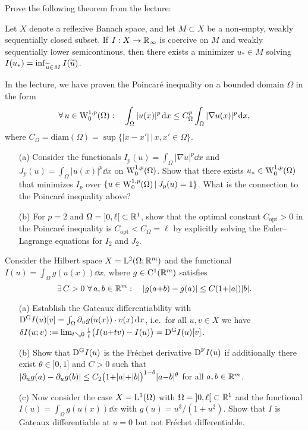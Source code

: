 \documentclass[12pt,a4paper]{article}
\begin{document}

\setcounter{AUFGABE}{32}



 Prove the following theorem from the lecture:

Let $X$ denote a reflexive Banach space, and let $M\subset X$ be a non-empty, weakly sequentially closed subset.
If $I:X\to {\mathbb R}_\infty$ is coercive on $M$ and weakly sequentially lower semicontinous, then there exists a minimizer $u_*\in M$ solving $I(u_*) = \inf_{\widetilde u \in M}I(\widetilde  u)$. 


In the lecture, we have proven the Poincar\'e inequality on a bounded domain 
$\Omega$ in the form
\[
\forall\, u\in{\mathrm W}^{1,p}_0(\Omega):\quad \int_\Omega |u(x)|^p \;\!\mathrm{d} x \leq C_\Omega^p \int_\Omega |\nabla u(x)|^p\;\!\mathrm{d} x,
\]
where $C_\Omega=\mathrm{diam}(\Omega) = \sup\{|x{-}x'|\,|\,x,x'\in\Omega\}$.

\begin{itemize}
\item[(a)] Consider the functionals $I_p(u) = \int_\Omega |\nabla u|^p\dd x$ and $J_p(u) = \int_\Omega |u(x)|^p\dd x$ on ${\mathrm W}^{1,p}_0(\Omega)$. Show that there exists $u_*\in {\mathrm W}^{1,p}_0(\Omega)$ that minimizes $I_p$ over $\{u\in {\mathrm W}^{1,p}_0(\Omega)\,|\, J_p(u) = 1\}$. What is the connection to the Poincar\'e inequality above?

\item[(b)] For $p=2$ and $\Omega=\left]0,\ell\right[\subset {\mathbb R}^1$, show that the optimal constant $C_\text{opt}>0$ in the Poincar\'e inequality is $C_\text{opt} < C_\Omega =\ell$ by explicitly solving the Euler--Lagrange equations for $I_2$ and $J_2$.
\end{itemize}

  Consider the Hilbert space $X={\mathrm L}^2(\Omega;{\mathbb R}^m)$ and the 
functional $I(u)=\int_\Omega g(u(x))\dd x $, where $g\in {\mathrm C}^1({\mathbb R}^m)$
satisfies 
\[
\exists\, C>0 \ \forall\, a,b\in {\mathbb R}^m:\quad |g(a{+}b)- g(a)| \leq
C(1{+}|a|) | b|.
\]
\begin{itemize}
\item [(a)] 
Establish the Gateaux differentiability with ${\mathrm D}^{\mathrm G} I(u)[v] =
\int_\Omega \partial_u g(u(x))\cdot v(x)\;\!\mathrm{d} x$, i.e.\ for all $u,v\in X$ we have 
$\delta I(u;v):= \lim_{t\searrow 0} \frac1t \big( I(u{+}tv) - I(u)\big)
=  {\mathrm D}^{\mathrm G} I(u)[v]$.
\item[(b)] 
Show that ${\mathrm D}^{\mathrm G} I(u)$ is the Fr\'echet derivative ${\mathrm D}^{\mathrm F}
I(u)$ if additionally 
there exist $\theta\in {]0,1]}$ and $C>0$
such that $ |\partial_u g(a)-\partial_u g(b)| \leq C_2
\big(1{+}|a|{+}|b|\big) ^{1-\theta} |a{-}b|^\theta$ for all $a,b\in
{\mathbb R}^m$.
\item[(c)] 
Now consider the case $X={\mathrm L}^1(\Omega)$ with $\Omega={]0,\ell[}
\subset {\mathbb R}^1$ and the functional $I(u)=\int_\Omega g(u(x)) \dd x $
with $g(u)=u^3/(1{+}u^2)$. Show that $I$ is Gateaux differentiable at
$u=0$ but not Fr\'echet differentiable. 
%
\end{itemize}
\end{document}
